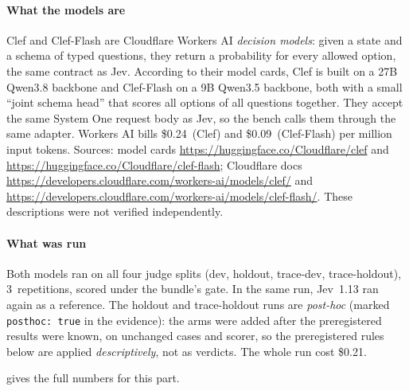 \documentclass[11pt,letterpaper]{article}
\newcommand{\code}[1]{\texttt{#1}}
\newcommand{\ClClefPrice}{0.24}
\newcommand{\ClFlashPrice}{0.09}
\newcommand{\ClSpend}{0.21}
\newcommand{\HoldReps}{3}
\begin{document}
{\raggedright
\paragraph{What the models are} Clef and Clef-Flash are Cloudflare Workers AI \emph{decision models}: given a state
and a schema of typed questions, they return a probability for every allowed option, the same contract as Jev.
According to their model cards, Clef is built on a 27B Qwen3.8 backbone and Clef-Flash on a 9B Qwen3.5 backbone, both
with a small ``joint schema head'' that scores all options of all questions together. They accept the same System One
request body as Jev, so the bench calls them through the same adapter. Workers AI bills \$\ClClefPrice\ (Clef) and
\$\ClFlashPrice\ (Clef-Flash) per million input tokens. Sources: model cards
\url{https://huggingface.co/Cloudflare/clef} and \url{https://huggingface.co/Cloudflare/clef-flash}; Cloudflare docs
\url{https://developers.cloudflare.com/workers-ai/models/clef/} and
\url{https://developers.cloudflare.com/workers-ai/models/clef-flash/}. These descriptions were not verified
independently.\par}

\paragraph{What was run} Both models ran on all four judge splits (dev, holdout, trace-dev, trace-holdout), \HoldReps\
repetitions, scored under the bundle's gate. In the same run, Jev~1.13 ran again as a reference. The holdout and
trace-holdout runs are \emph{post-hoc} (marked \code{posthoc: true} in the evidence): the arms were added after the
preregistered results were known, on unchanged cases and scorer, so the preregistered rules below are applied
\emph{descriptively}, not as verdicts. The whole run cost \$\ClSpend.

 gives the full numbers for this part.
\end{document}
